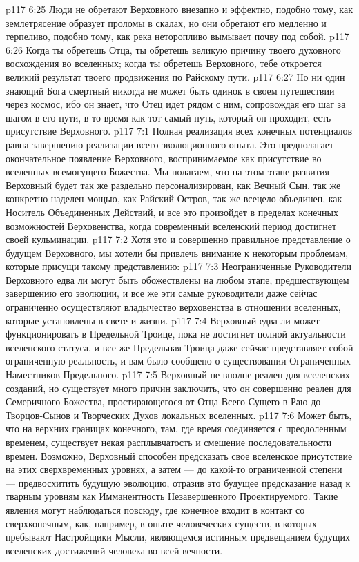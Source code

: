 \vs p117 6:25 \pc Люди не обретают Верховного внезапно и эффектно, подобно тому, как землетрясение образует проломы в скалах, но они обретают его медленно и терпеливо, подобно тому, как река неторопливо вымывает почву под собой.
\vs p117 6:26 Когда ты обретешь Отца, ты обретешь великую причину твоего духовного восхождения во вселенных; когда ты обретешь Верховного, тебе откроется великий результат твоего продвижения по Райскому пути.
\vs p117 6:27 Но ни один знающий Бога смертный никогда не может быть одинок в своем путешествии через космос, ибо он знает, что Отец идет рядом с ним, сопровождая его шаг за шагом в его пути, в то время как тот самый путь, который он проходит, есть присутствие Верховного.
\vs p117 7:1 Полная реализация всех конечных потенциалов равна завершению реализации всего эволюционного опыта. Это предполагает окончательное появление Верховного, воспринимаемое как присутствие во вселенных всемогущего Божества. Мы полагаем, что на этом этапе развития Верховный будет так же раздельно персонализирован, как Вечный Сын, так же конкретно наделен мощью, как Райский Остров, так же всецело объединен, как Носитель Объединенных Действий, и все это произойдет в пределах конечных возможностей Верховенства, когда современный вселенский период достигнет своей кульминации.
\vs p117 7:2 Хотя это и совершенно правильное представление о будущем Верховного, мы хотели бы привлечь внимание к некоторым проблемам, которые присущи такому представлению:
\vs p117 7:3 \bibnobreakspace Неограниченные Руководители Верховного едва ли могут быть обожествлены на любом этапе, предшествующем завершению его эволюции, и все же эти самые руководители даже сейчас ограниченно осуществляют владычество верховенства в отношении вселенных, которые установлены в свете и жизни.
\vs p117 7:4 \bibnobreakspace Верховный едва ли может функционировать в Предельной Троице, пока не достигнет полной актуальности вселенского статуса, и все же Предельная Троица даже сейчас представляет собой ограниченную реальность, и вам было сообщено о существовании Ограниченных Наместников Предельного.
\vs p117 7:5 \bibnobreakspace Верховный не вполне реален для вселенских созданий, но существует много причин заключить, что он совершенно реален для Семеричного Божества, простирающегося от Отца Всего Сущего в Раю до Творцов\hyp{}Сынов и Творческих Духов локальных вселенных.
\vs p117 7:6 \pc Может быть, что на верхних границах конечного, там, где время соединяется с преодоленным временем, существует некая расплывчатость и смешение последовательности времен. Возможно, Верховный способен предсказать свое вселенское присутствие на этих сверхвременных уровнях, а затем --- до какой\hyp{}то ограниченной степени --- предвосхитить будущую эволюцию, отразив это будущее предсказание назад к тварным уровням как Имманентность Незавершенного Проектируемого. Такие явления могут наблюдаться повсюду, где конечное входит в контакт со сверхконечным, как, например, в опыте человеческих существ, в которых пребывают Настройщики Мысли, являющемся истинным предвещанием будущих вселенских достижений человека во всей вечности.
